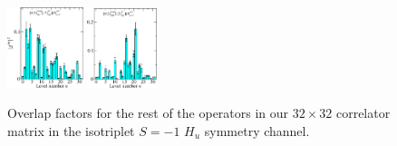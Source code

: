 \begin{figure}[H]
    \centering
    \includegraphics[width=0.1975\textwidth]{figures/sigmas/hu/zfactors/zfactor_isotriplet_pion_sigma-Hu_1-P010-A2m-SS_1-P0-10-G1-SS_2.pdf}
    \includegraphics[width=0.18\textwidth]{figures/sigmas/hu/zfactors/zfactor_isotriplet_pion_sigma-Hu_1-P011-A2m-SS_0-P0-1-1-G-SS_1.pdf}
    \caption{Overlap factors for the rest of the operators in our $32\times 32$ correlator matrix in the isotriplet $S=-1$ $H_u$ symmetry channel.}\label{fig:hu_zfactors2}
\end{figure}


